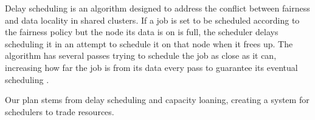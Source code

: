 Delay scheduling is an algorithm designed to address the conflict between fairness and data locality in 
shared clusters. 
If a job is set to be scheduled according to the fairness policy but the node its data is on is full, 
the scheduler delays scheduling it in an attempt to schedule it on that node when it frees up. The algorithm 
has several passes trying to schedule the job as close as it can, increasing how far the job is from its data every pass 
to guarantee its eventual scheduling \cite{zaharia_delay_2010}.



Our plan stems from delay scheduling and capacity loaning, creating a system for schedulers 
to trade resources.
